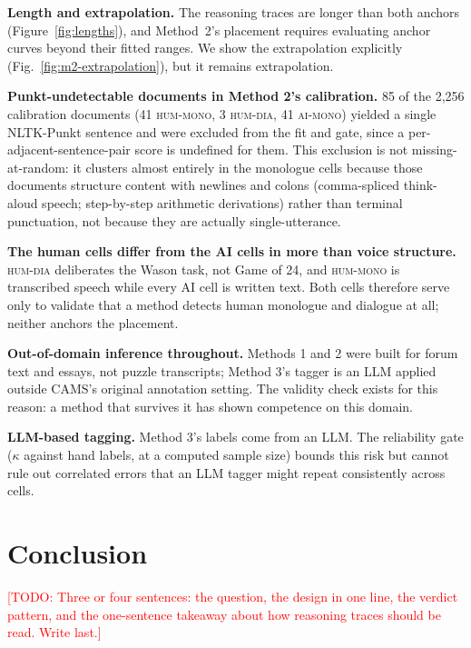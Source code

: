 \documentclass[11pt]{article}
\newcommand{\todo}[1]{\textcolor{red}{[TODO: #1]}}
\newcommand{\cellhm}{\textsc{hum-mono}}
\newcommand{\cellhd}{\textsc{hum-dia}}
\newcommand{\cellam}{\textsc{ai-mono}}
\begin{document}
\textbf{Length and extrapolation.} The reasoning traces are longer than both
anchors (Figure~\ref{fig:lengths}), and Method~2's placement requires
evaluating anchor curves beyond their fitted ranges. We show the extrapolation
explicitly (Fig.~\ref{fig:m2-extrapolation}), but it remains extrapolation.

\textbf{Punkt-undetectable documents in Method 2's calibration.} 85 of the
2{,}256 calibration documents (41 \cellhm{}, 3 \cellhd{}, 41 \cellam{}) yielded
a single NLTK-Punkt sentence and were excluded from the fit and gate, since a
per-adjacent-sentence-pair score is undefined for them. This exclusion is not
missing-at-random: it clusters almost entirely in the monologue cells because
those documents structure content with newlines and colons (comma-spliced
think-aloud speech; step-by-step arithmetic derivations) rather than
terminal punctuation, not because they are actually single-utterance.

\textbf{The human cells differ from the AI cells in more than voice
structure.} \cellhd{} deliberates the Wason task, not Game of 24, and
\cellhm{} is transcribed speech while every AI cell is written text. Both
cells therefore serve only to validate that a method detects human monologue
and dialogue at all; neither anchors the placement.

\textbf{Out-of-domain inference throughout.} Methods 1 and 2 were built for
forum text and essays, not puzzle transcripts; Method 3's tagger is an LLM
applied outside CAMS's original annotation setting. The validity check exists
for this reason: a method that survives it has shown competence on this
domain.

\textbf{LLM-based tagging.} Method 3's labels come from an LLM. The
reliability gate ($\kappa$ against hand labels, at a computed sample size)
bounds this risk but cannot rule out correlated errors that an LLM tagger
might repeat consistently across cells.

\section{Conclusion}
\label{sec:conclusion}

\todo{Three or four sentences: the question, the design in one line, the
verdict pattern, and the one-sentence takeaway about how reasoning traces
should be read. Write last.}



\end{document}
